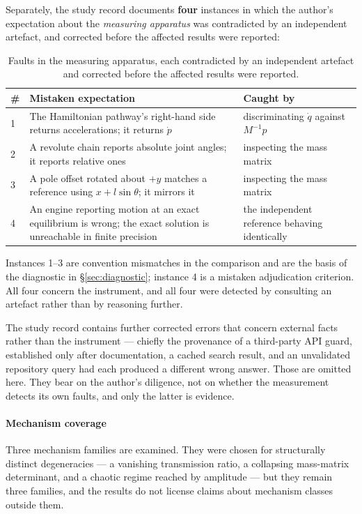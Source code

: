 \documentclass[review,12pt]{elsarticle}
\begin{document}
Separately, the study record documents \textbf{four} instances in which the
author's expectation about the \emph{measuring apparatus} was contradicted by an
independent artefact, and corrected before the affected results were reported:

\begin{table}[!htbp]
\centering
\caption{Faults in the measuring apparatus, each contradicted by an independent
artefact and corrected before the affected results were reported.}
\label{tab:apparatus}
\begin{tabular}{@{}lL{0.42\textwidth}L{0.22\textwidth}@{}}
\toprule
\textbf{\#} & \textbf{Mistaken expectation} & \textbf{Caught by} \\
 & The Hamiltonian pathway's right-hand side returns accelerations; it returns $\dot p$ & discriminating $\dot q$ against $M^{-1}p$ \\
2 & A revolute chain reports absolute joint angles; it reports relative ones & inspecting the mass matrix \\
3 & A pole offset rotated about $+y$ matches a reference using $x + l\sin\theta$; it mirrors it & inspecting the mass matrix \\
4 & An engine reporting motion at an exact equilibrium is wrong; the exact solution is unreachable in finite precision & the independent reference behaving identically \\
\bottomrule
\end{tabular}
\end{table}

\noindent Instances 1--3 are convention mismatches in the comparison and are the
basis of the diagnostic in \S\ref{sec:diagnostic}; instance 4 is a mistaken
adjudication criterion. All four concern the instrument, and all four were
detected by consulting an artefact rather than by reasoning further.

The study record contains further corrected errors that concern external facts
rather than the instrument --- chiefly the provenance of a third-party API
guard, established only after documentation, a cached search result, and an
unvalidated repository query had each produced a different wrong answer. Those
are omitted here. They bear on the author's diligence, not on whether the
measurement detects its own faults, and only the latter is evidence.

\paragraph{Mechanism coverage}
Three mechanism families are examined. They were chosen for structurally
distinct degeneracies --- a vanishing transmission ratio, a collapsing
mass-matrix determinant, and a chaotic regime reached by amplitude --- but they
remain three families, and the results do not license claims about mechanism
classes outside them.
\end{document}
